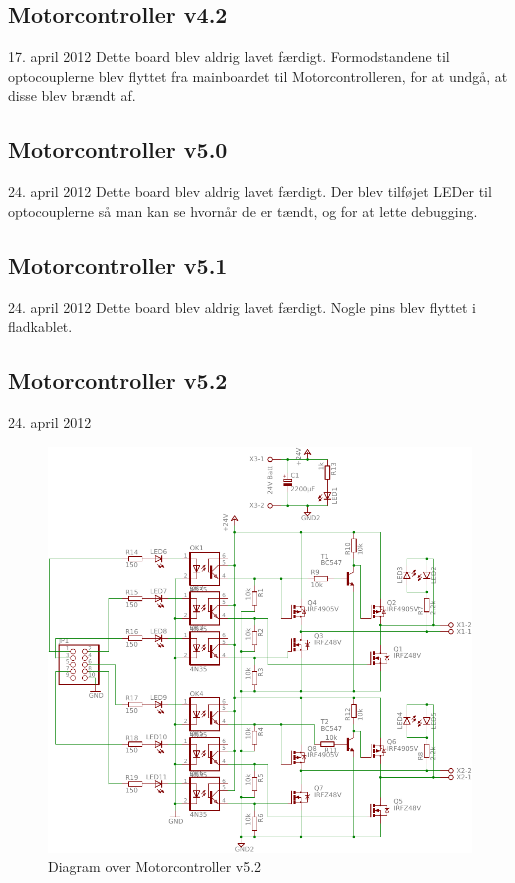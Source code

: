 \documentclass[a4paper,oneside,article,danish,table]{memoir}
\newcommand{\boarddate}[1]{\textcolor{blue!80!black}{#1}}
\begin{document}
\subsection{Motorcontroller v4.2}
\boarddate{17. april 2012} Dette board blev aldrig lavet færdigt.
Formodstandene til optocouplerne blev flyttet fra mainboardet til Motorcontrolleren, for at undgå, at disse blev brændt af.

\subsection{Motorcontroller v5.0}
\boarddate{24. april 2012} Dette board blev aldrig lavet færdigt.
Der blev tilføjet LEDer til optocouplerne så man kan se hvornår de er tændt, og for at lette debugging.  

\subsection{Motorcontroller v5.1}
\boarddate{24. april 2012} Dette board blev aldrig lavet færdigt.
Nogle pins blev flyttet i fladkablet. 

\subsection{Motorcontroller v5.2}
\boarddate{24. april 2012}
\begin{figure}[htbp]
  \centering
  \includegraphics[width=\textwidth]{pictures/MotorcontrollerSch5-2.pdf}
  \caption{Diagram over Motorcontroller v5.2}
  \label{fig:mosch5.2}
\end{figure}
\end{document}
